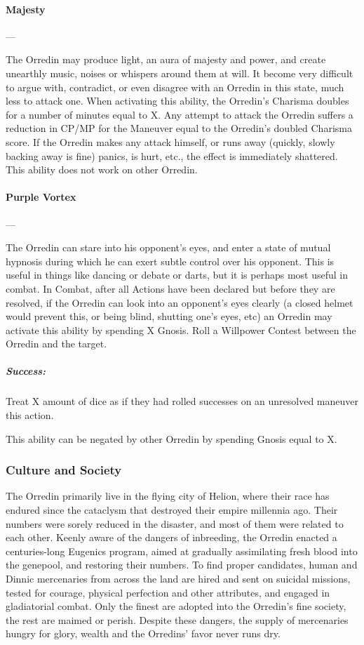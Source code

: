 \documentclass[oneside,11pt,english]{book}
\begin{document}
\paragraph{\large\label{man:Majesty} Majesty}---\quad{\large[X]}\par
The Orredin may produce light, an aura of majesty and power, and create unearthly music, noises or 
whispers around them at will. It become very difficult to argue with, contradict, or even disagree with an 
Orredin in this state, much less to attack one. When activating this ability, the Orredin's Charisma doubles for a number of minutes equal to X. Any attempt to attack the Orredin suffers a reduction in CP/MP for 
the Maneuver equal to the Orredin's doubled Charisma score. 
If the Orredin makes any attack himself, or runs away (quickly, slowly backing away is fine) panics, is hurt, etc., the effect is immediately shattered. 
This ability does not work on other Orredin. 


\paragraph{\large\label{man:Purple Vortex} Purple Vortex}---\quad{\large[X]}\par
The Orredin can stare into his opponent’s eyes, and enter a state of mutual hypnosis during which he can exert subtle control over his opponent. This is useful in things like dancing or debate or darts, but it is perhaps most useful in combat. 
In Combat, after all Actions have been declared but before they are resolved, if the Orredin can look into 
an opponent’s eyes clearly (a closed helmet would prevent this, or being blind, shutting one’s eyes, etc) 
an Orredin may activate this ability by spending X Gnosis. Roll a Willpower Contest between the Orredin and the target.
\vspace*{-15pt}\subparagraph{Success:} Treat X amount of dice as if they had rolled successes on an unresolved maneuver this action.\par
This ability can be negated by other Orredin by spending Gnosis equal to X.
\subsubsection*{Culture and Society} 
The Orredin primarily live in the flying city of Helion, where their race has endured since the cataclysm that destroyed their empire millennia ago. Their numbers were sorely reduced in the disaster, and most of them were related to each other. Keenly aware of the dangers of inbreeding, the Orredin enacted a centuries-long Eugenics program, aimed at gradually assimilating fresh blood into the genepool, and 
restoring their numbers. To find proper candidates, human and Dinnic mercenaries from across the land 
are hired and sent on suicidal missions, tested for courage, physical perfection and other attributes, and 
engaged in gladiatorial combat. Only the finest are adopted into the Orredin’s fine society, the rest are 
maimed or perish. Despite these dangers, the supply of mercenaries hungry for glory, wealth and the 
Orredins’ favor never runs dry. 
\end{document}
